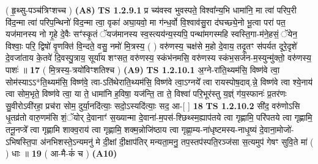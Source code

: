 \documentclass[17pt]{extarticle}
\begin{document}
                  \newline
                      ( हृ॒थ्सु-पञ्च॑त्रिꣳशच्च )  \textbf{(A8)} \newline \newline
                                        \textbf{ TS 1.2.9.1} \newline
                  प्र च्य॑वस्व भुवस्पते॒ विश्वा᳚न्य॒भि धामा॑नि॒ मा त्वा॑ परिप॒री वि॑द॒न्मा त्वा॑ परिप॒न्थिनो॑ विद॒न्मा त्वा॒ वृका॑ अघा॒यवो॒ मा ग॑न्ध॒र्वो वि॒श्वाव॑सु॒रा द॑घच्छ्ये॒नो भू॒त्वा परा॑ पत॒ यज॑मानस्य नो गृ॒हे दे॒वैः सꣳ॑स्कृ॒तं ॅयज॑मानस्य स्व॒स्त्यय॑न्य॒स्यपि॒ पन्था॑मगस्महि स्वस्ति॒गा-म॑ने॒हसं॒ ॅयेन॒ विश्वाः॒ परि॒ द्विषो॑ वृ॒णक्ति॑ वि॒न्दते॒ वसु॒ नमो॑ मि॒त्रस्य॒ ( ) वरु॑णस्य॒ चक्ष॑से म॒हो दे॒वाय॒ तदृ॒तꣳ स॑पर्यत दूरे॒दृशे॑ दे॒वजा॑ताय के॒तवे॑ दि॒वस्पु॒त्राय॒ सूर्या॑य शꣳसत॒ वरु॑णस्य॒ स्कंभ॑नमसि॒ वरु॑णस्य स्कंभ॒सर्ज॑न-म॒स्युन्मु॑क्तो॒ वरु॑णस्य॒ पाशः॑ ॥ \textbf{  17 } \newline
                  \newline
                      ( मि॒त्रस्य॒-त्रयो॑विꣳशतिश्च )  \textbf{(A9)} \newline \newline
                                        \textbf{ TS 1.2.10.1} \newline
                  अ॒ग्ने-रा॑ति॒थ्यम॑सि॒ विष्ण॑वे त्वा॒ सोम॑स्याऽऽ*ति॒थ्यम॑सि॒ विष्ण॑वे॒ त्वा-ऽति॑थेराति॒थ्यम॑सि॒ विष्ण॑वे त्वा॒ऽग्नये᳚ त्वा रायस्पोष॒दाव्.न्ने॒ विष्ण॑वे त्वा श्ये॒नाय॑ त्वा सोम॒भृते॒ विष्ण॑वे त्वा॒ या ते॒ धामा॑नि ह॒विषा॒ यज॑न्ति॒ ता ते॒ विश्वा॑ परि॒भूर॑स्तु य॒ज्ञ्ं ग॑य॒स्फानः॑ प्र॒तर॑णः सु॒वीरोऽवी॑रहा॒ प्रच॑रा सोम॒ दुर्या॒नदि॑त्याः॒ सदो॒ऽस्यदि॑त्याः॒ सद॒ आ-[ ] \textbf{  18} \newline
                  \newline
                                \textbf{ TS 1.2.10.2} \newline
                  सी॑द॒ वरु॑णोऽसि धृ॒तव्र॑तो वारु॒णम॑सि शं॒ॅयोर् दे॒वानाꣳ॑ स॒ख्यान्मा दे॒वाना॑-म॒पस॑-श्छिथ्स्म॒ह्याप॑तये त्वा गृह्णामि॒ परि॑पतये त्वा गृह्णामि॒ तनू॒नप्त्रे᳚ त्वा गृह्णामि शाक्व॒राय॑ त्वा गृह्णामि॒ शक्म॒न्नोजि॑ष्ठाय त्वा गृह्णा॒म्य-ना॑धृष्टमस्य-नाधृ॒ष्यं दे॒वाना॒मोजो॑- ऽभिषस्ति॒पा अ॑नभिशस्ते॒ऽन्यमनु॑ मे दी॒क्षां दी॒क्षाप॑तिर् मन्यता॒मनु॒ तप॒स्तप॑स्पति॒रञ्ज॑सा स॒त्यमुप॑ गेषꣳ सुवि॒ते मा॑ ( ) धाः ॥ \textbf{  19 } \newline
                  \newline
                      ( आ-मै-कं॑ च )  \textbf{(A10)} \newline \newline
\end{document}
